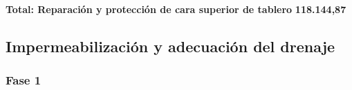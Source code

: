 %
\noindent%
\large%
\textbf{Total: Reparación y protección de cara superior de tablero }%
\dotfill%
\textbf{118.144,87}%
\newline%
\normalsize

%
\subsection{Impermeabilización y adecuación del drenaje}%
\subsubsection{Fase 1}%
\small%
%
%
%
\tablelasttail{\hline%
}%
